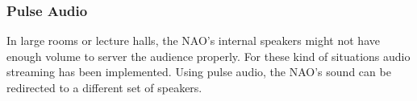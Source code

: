 \subsubsection{Pulse Audio}
In large rooms or lecture halls, the NAO's internal speakers might not have enough volume to server the audience properly. For these kind of situations audio streaming has been implemented. Using pulse audio, the NAO's sound can be redirected to a different set of speakers.

